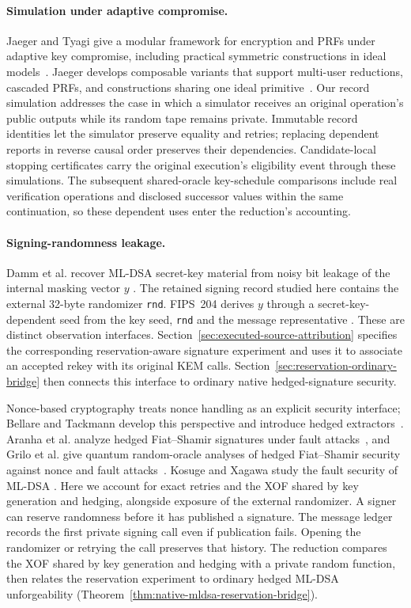 \paragraph{Simulation under adaptive compromise.}
Jaeger and Tyagi give a modular framework for encryption and PRFs under
adaptive key compromise, including practical symmetric constructions in
ideal models~\cite{jaeger2020adaptive}. Jaeger develops composable variants
that support multi-user reductions, cascaded PRFs, and constructions
sharing one ideal primitive~\cite{jaeger2023program}.
Our record simulation addresses the case in which a simulator
receives an original operation's public outputs while its random tape
remains private. Immutable record identities let the simulator preserve
equality and retries; replacing dependent reports in reverse causal order
preserves their dependencies. Candidate-local stopping certificates carry
the original execution's eligibility event through these simulations.
The subsequent shared-oracle key-schedule comparisons include real
verification operations and disclosed successor values within the same
continuation, so these dependent uses enter the reduction's accounting.

\paragraph{Signing-randomness leakage.}
Damm et al. recover ML-DSA secret-key material from noisy bit leakage of
the internal masking vector $y$ \cite{damm2026}. The retained signing
record studied here contains the external 32-byte randomizer
\texttt{rnd}. FIPS~204 derives $y$ through a secret-key-dependent seed
from the key seed, \texttt{rnd} and the message representative
\cite[Algorithm~7]{fips204}. These are distinct observation interfaces.
Section~\ref{sec:executed-source-attribution} specifies the corresponding
reservation-aware signature experiment and uses it to associate an accepted
rekey with its original KEM calls. Section~\ref{sec:reservation-ordinary-bridge}
then connects this interface to ordinary native hedged-signature security.

Nonce-based cryptography treats nonce handling as an explicit security
interface; Bellare and Tackmann develop this perspective and introduce
hedged extractors~\cite{bellare2016nonce}. Aranha et al. analyze hedged
Fiat--Shamir signatures under fault attacks~\cite{aranha2020hedged}, and
Grilo et al. give quantum random-oracle analyses of hedged Fiat--Shamir
security against nonce and fault attacks~\cite{grilo2021reprogramming}.
Kosuge and Xagawa study the fault security of ML-DSA
\cite{kosuge2025mldsa}.
Here we account for exact retries and the XOF shared by key generation
and hedging, alongside exposure of the external randomizer. A signer can
reserve randomness before it has published a signature. The message ledger
records the first private signing call
even if publication fails. Opening the randomizer or retrying the call
preserves that history. The reduction compares the XOF shared by key
generation and hedging with a private random function, then relates the
reservation experiment to ordinary hedged ML-DSA unforgeability
(Theorem~\ref{thm:native-mldsa-reservation-bridge}).

